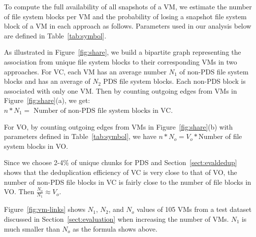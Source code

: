 To compute the full availability of all snapshots of a VM, we estimate
the number of file system blocks per VM and the probability of losing a snapshot file system 
block of a VM in each approach as follows.
Parameters used in our analysis below are defined in Table~\ref{tab:symbol}. 

As illustrated in Figure~\ref{fig:share}, we build a bipartite graph representing the
association from unique file system blocks to their corresponding VMs in two 
approaches. 
For VC, each VM has an average number $N_1$ of non-PDS file system blocks
and  has  an average of  $N_2$ PDS file system blocks. 
Each non-PDS block is associated with only one VM.
Then by counting outgoing edges from VMs in Figure~\ref{fig:share}(a), we get:
$
n* N_1   = \mbox{ Number of non-PDS file system blocks in VC.} 
$

For VO, 
by counting outgoing edges from VMs in Figure~\ref{fig:share}(b) with parameters defined in
Table~\ref{tab:symbol},  we have $n *N_o   =  V_o * $Number of file system blocks in VO.

Since we choose 2-4\% of unique chunks for PDS
and Section~\ref{sect:evaldedup} 
shows that the deduplication efficiency of VC is very close to that of VO,
the number of non-PDS file blocks in VC is fairly close to the number of file blocks in VO.
Then
$
\frac{N_o}{N_1} \approx  V_o.
$

Figure~\ref{fig:vm-links} shows $N_1$, $N_2$, and $N_o$ values of 105 VMs from a  test dataset 
discussed in Section~\ref{sect:evaluation} when increasing the number of VMs.  
$N_1$ is much smaller than $N_o$ as the formula shows above. 


